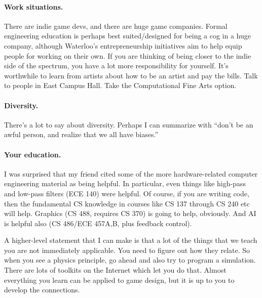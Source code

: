 \documentclass[11pt]{article}
\begin{document}
\paragraph{Work situations.} There are indie game devs, and there are huge game companies.
Formal engineering education is perhaps best suited/designed for being
a cog in a huge company, although Waterloo's entrepreneurship
initiatives aim to help equip people for working on their own.
If you are thinking of being closer to the indie side of the spectrum, you have a lot more
responsibility for yourself. It's worthwhile to learn from artists about how to be an artist
and pay the bills. Talk to people in East Campus Hall. Take the Computational Fine Arts option.

\paragraph{Diversity.} There's a lot to say about diversity. Perhaps I can summarize with 
``don't be an awful person, and realize that we all have biases.''

\paragraph{Your education.} 
I was surprised that my friend cited some of the more hardware-related
computer engineering material as being helpful. In particular, even
things like high-pass and low-pass filters (ECE 140) were helpful. Of
course, if you are writing code, then the fundamental CS knowledge in
courses like CS 137 through CS 240 etc will help. Graphics (CS 488,
requires CS 370) is going to help, obviously. And AI is helpful also
(CS 486/ECE 457A,B, plus feedback control).

A higher-level statement that I can make is that a lot of the things
that we teach you are not immediately applicable. You need to figure
out how they relate. So when you see a physics principle, go ahead and
also try to program a simulation. There are lots of toolkits on the
Internet which let you do that. Almost everything you learn can be
applied to game design, but it is up to you to develop the
connections.
\end{document}
